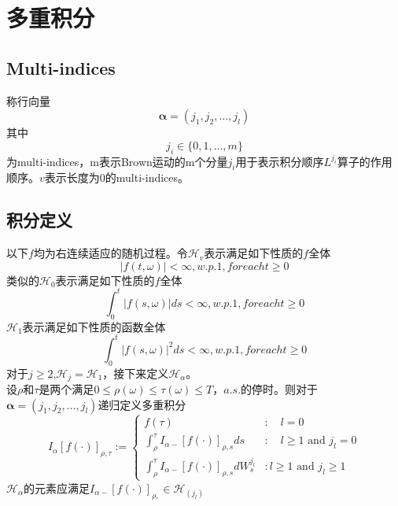 \documentclass{article}%
\begin{document}
\section{多重积分}
\subsection{Multi-indices}
称行向量
$$
\boldsymbol{\alpha}=\left(j_{1}, j_{2}, \dots, j_{l}\right)
$$
其中$$
j_{i} \in\{0,1, \ldots, m\}
$$
为multi-indices，m表示Brown运动的m个分量$j_i$用于表示积分顺序$L^{j_i}$算子的作用顺序。$v$表示长度为0的multi-indices。
\subsection{积分定义}
以下$f$均为右连续适应的随机过程。令$\mathcal{H}_v$表示满足如下性质的$f$全体
$$|f(t,\omega)|<\infty, w.p.1,for each t\geq 0$$
类似的$\mathcal{H}_0$表示满足如下性质的$f$全体
$$
\int_{0}^{t}|f(s, \omega)| d s<\infty,w.p.1,for each t\geq 0
$$
$\mathcal{H}_1$表示满足如下性质的函数全体
$$
\int_{0}^{t}|f(s, \omega)|^2 d s<\infty,w.p.1,for each t\geq 0
$$
对于$j\geq2$,$\mathcal{H}_j=\mathcal{H}_1$，接下来定义$\mathcal{H}_{\alpha}$。\\
设$\rho$和$\tau$是两个满足$0\leq \rho(\omega)\leq \tau(\omega)\leq T，a.s.$的停时。则对于$\boldsymbol{\alpha}=\left(j_{1}, j_{2}, \dots, j_{l}\right)$递归定义多重积分
\begin{equation}
I_{\alpha}[f(\cdot)]_{\rho, \tau}:=\left\{\begin{array}{ll}
f(\tau) & : \quad l=0 \\
\int_{\rho}^{\tau} I_{\alpha-}[f(\cdot)]_{\rho, s} d s & : \quad l \geq 1 \text { and } j_{l}=0 \\
\int_{\rho}^{\tau} I_{\alpha-}[f(\cdot)]_{\rho, s} d W_{s}^{j_{l}} & : l \geq 1 \text { and } j_{l} \geq 1
\end{array}\right.
\end{equation}
$\mathcal{H}_{\alpha}$的元素应满足$I_{\alpha-}[f(\cdot)]_{\rho,} \in \mathcal{H}_{\left(j_{l}\right)}$
\end{document}
